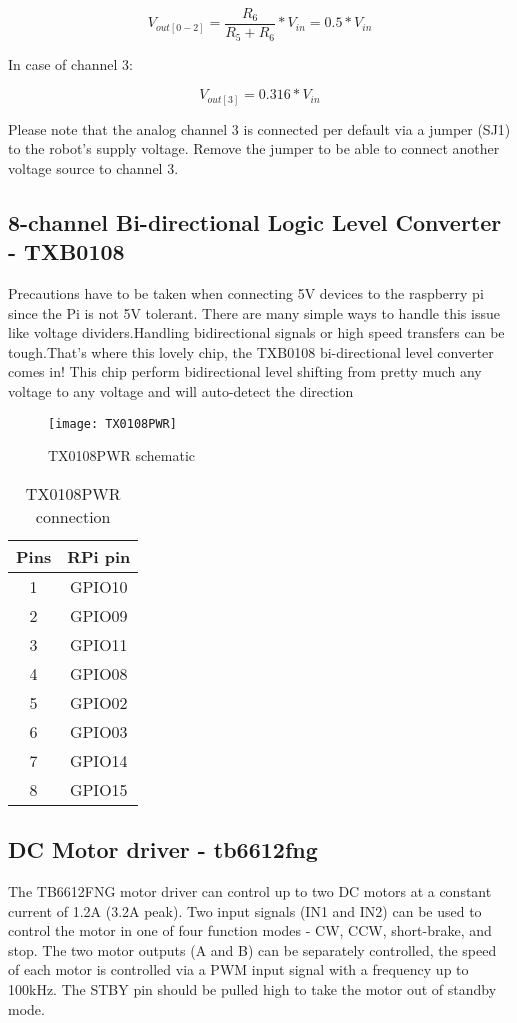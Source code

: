 \documentclass[
12pt, %
a4paper, %
oneside, %
headinclude,footinclude, %
BCOR5mm, %
]{scrartcl}
\begin{document}
\[ V_{ out[0-2] } = \frac{ R_{6} }{ R_{5} + R_{6} } * V_{in}  = 0.5* V_{in}\]

In case of channel 3:

\[ V_{out[3]} = 0.316 * V_{in}\]

Please note that the analog channel 3 is connected per default via a jumper (SJ1) to the robot's supply voltage. Remove the jumper to be able to connect another voltage source to channel 3. 

\subsection{8-channel Bi-directional Logic Level Converter - TXB0108}
Precautions have to be taken when connecting 5V devices to the raspberry pi since the Pi is not 5V tolerant. There are many simple ways to handle this issue like voltage dividers.Handling bidirectional signals or high speed transfers can be tough.That's where this lovely chip, the TXB0108 bi-directional level converter comes in! This chip perform bidirectional level shifting from pretty much any voltage to any voltage and will auto-detect the direction 

\begin{figure}[h]
\centering
\texttt{[image: TX0108PWR]} 
\caption[TX0108PWR schematic]{TX0108PWR schematic}
\label{fig:TX0108PWR}
\end{figure}

\begin{table}[H]
\caption{TX0108PWR connection}
\centering
\begin{tabular}{cc}
\toprule
Pins & RPi pin \\
\midrule
1  & GPIO10 \\
2  & GPIO09 \\
3  & GPIO11 \\
4  & GPIO08 \\
5  & GPIO02 \\
6  & GPIO03 \\
7  & GPIO14 \\
8  & GPIO15 \\
\bottomrule
\end{tabular}
\label{tab:label}
\end{table}
\subsection {DC Motor driver - tb6612fng}
The TB6612FNG motor driver can control up to two DC motors at a constant current of 1.2A (3.2A peak). Two input signals (IN1 and IN2) can be used to control the motor in one of four function modes - CW, CCW, short-brake, and stop. The two motor outputs (A and B) can be separately controlled, the speed of each motor is controlled via a PWM input signal with a frequency up to 100kHz. The STBY pin should be pulled high to take the motor out of standby mode.
\end{document}
